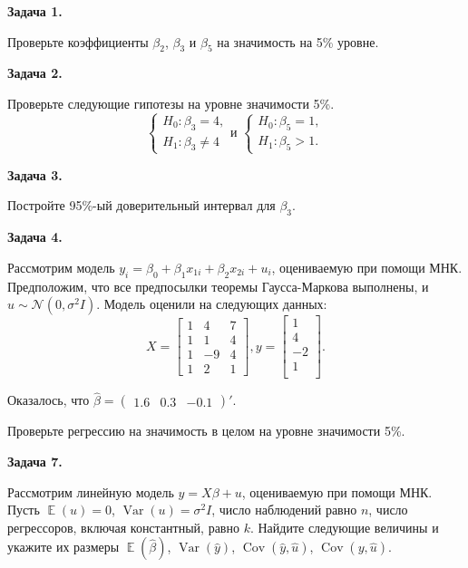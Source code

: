 \documentclass[10pt, a4paper]{extarticle}
\DeclareMathOperator{\cov}{Cov}
\DeclareMathOperator{\Var}{Var}
\DeclareMathOperator{\E}{\mathbb{E}}
\begin{document}
	{\Large \textbf{Задача 1.}}
	
    Проверьте коэффициенты $\beta_2$, $\beta_3$ и $\beta_5$ на значимость на 5\% уровне.
	\vspace{1em}
		
	{\Large \textbf{Задача 2.}}

	  Проверьте следующие гипотезы на уровне значимости 5\%.
		\[
		\begin{cases}
			H_0: \beta_3 = 4, \\
			H_1: \beta_3 \ne 4
		\end{cases}\text{и } 
		\begin{cases}
			H_0: \beta_5 = 1, \\
			H_1: \beta_5 > 1.
		\end{cases}
		\]
	\vspace{1em}

	{\Large \textbf{Задача 3.}}
	
	Постройте 95\%-ый доверительный интервал для $\beta_3$.
	\vspace{1em}
	\newpage

	{\Large \textbf{Задача 4.}}
	
	Рассмотрим модель $y_i = \beta_0 + \beta_1x_{1i} + \beta_2x_{2i} + u_i$, оцениваемую при помощи МНК. Предположим, что все предпосылки теоремы Гаусса-Маркова выполнены, и $u \sim \mathcal{N}(0, \sigma^2I)$. Модель оценили на следующих данных:
	\[
	X = \begin{bmatrix}
		1 & 4 & 7 \\
		1 & 1 & 4 \\
		1 & -9 & 4 \\
		1 & 2 & 1
	\end{bmatrix},
	y = \begin{bmatrix}
		1 \\
		4 \\
		-2 \\
		1 \\
	\end{bmatrix}.
	\]
	
	Оказалось, что $\hat{\beta} = \begin{pmatrix}
		1.6 & 0.3 & -0.1
	\end{pmatrix}'$.

	Проверьте регрессию на значимость в целом на уровне значимости 5\%.
	\vspace{1em}
	
	{\Large \textbf{Задача 7.}}
	
	Рассмотрим линейную модель $y = X\beta + u$, оцениваемую при помощи МНК. Пусть $\E(u) = 0$, $\Var(u) = \sigma^2 I$, число наблюдений равно $n$, число регрессоров, включая константный, равно $k$. Найдите следующие величины и укажите их размеры
	 $\E(\hat{\beta})$, $\Var(\hat{y})$, $\cov(\hat{y}, \hat{u})$, $\cov(y, \hat{u})$.
	\vspace{1em}
\end{document}
